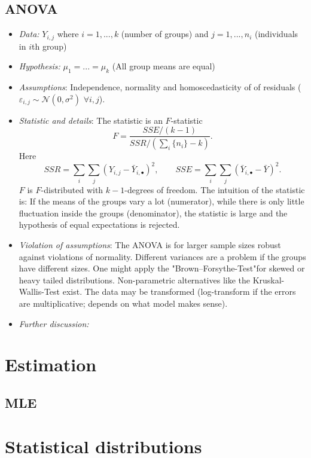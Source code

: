 \documentclass[12pt,a4paper]{amsart}
\theoremstyle{definition}
\theoremstyle{remark}
\numberwithin{equation}{section}
\begin{document}
\subsection{ANOVA}


\begin{itemize}
\item\textit{Data:} $Y_{i,j}$ where $i=1,...,k$ (number of groups) and $j=1,...,n_i$ (individuals in $i$th group)
\item\textit{Hypothesis:}  $\mu_1=...=\mu_k$ (All group means are equal)
\item \textit{Assumptions}: Independence, normality and homoscedasticity of of residuals ($\varepsilon_{i,j } \sim \mathcal{N}(0, \sigma^2) \,\, \forall i,j$).
\item \textit{Statistic and details}: The statistic is an $F$-statistic
$$ F=\frac{SSE/(k-1)}{SSR/(\sum_i \{n_i\}-k)}.$$
Here 
$$SSR= \sum_i \sum_j (Y_{i,j}- \bar Y_{i,\bullet})^2, \quad\quad SSE= \sum_i \sum_j (\bar Y_{i,\bullet}- \bar Y)^2.$$
$F$ is $F$-distributed with $k-1$-degrees of freedom. The intuition of the statistic is: If the means of the groups vary a lot (numerator), while there is only little fluctuation inside the groups (denominator), the statistic is large and the hypothesis of equal expectations is rejected.
\item  \textit{Violation of assumptions}: The ANOVA is for larger sample sizes robust against violations of normality. Different variances are a problem if the groups have different sizes. One might apply the "Brown–Forsythe-Test"for skewed or heavy tailed distributions. Non-parametric alternatives like the  Kruskal-Wallis-Test exist. The data may be transformed (log-transform if the errors are multiplicative; depends on what model makes sense). 
\item \textit{Further discussion:} 
\end{itemize}



\section{Estimation}

\subsection{MLE}

\section{Statistical distributions}
\end{document}
